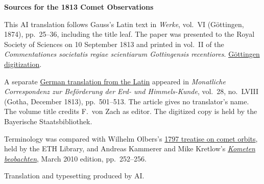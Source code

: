 \clearpage\thispagestyle{empty}
\begin{center}\textbf{Sources for the 1813 Comet Observations}\end{center}
\noindent This AI translation follows Gauss’s Latin text in \textit{Werke}, vol.~VI (Göttingen, 1874), pp.~25--36, including the title leaf. The paper was presented to the Royal Society of Sciences on 10 September 1813 and printed in vol.~II of the \textit{Commentationes societatis regiae scientiarum Gottingensis recentiores}. \href{https://gdz.sub.uni-goettingen.de/id/PPN236007467}{Göttingen digitization}.
\par\smallskip\noindent A separate \href{https://www.digitale-sammlungen.de/de/view/bsb10538617?page=517}{German translation from the Latin} appeared in \textit{Monatliche Correspondenz zur Beförderung der Erd- und Himmels-Kunde}, vol.~28, no.~LVIII (Gotha, December 1813), pp.~501--513. The article gives no translator’s name. The volume title credits F.~von Zach as editor. The digitized copy is held by the Bayerische Staatsbibliothek.
\par\smallskip\noindent Terminology was compared with Wilhelm Olbers’s \href{https://www.e-rara.ch/zut/content/titleinfo/449756}{1797 treatise on comet orbits}, held by the ETH Library, and Andreas Kammerer and Mike Kretlow’s \href{https://fg-kometen.vdsastro.de/Publ/kometen_beobachten_2.0.pdf}{\textit{Kometen beobachten}}, March 2010 edition, pp.~252--256.
\par\smallskip\noindent Translation and typesetting produced by AI.
\clearpage
